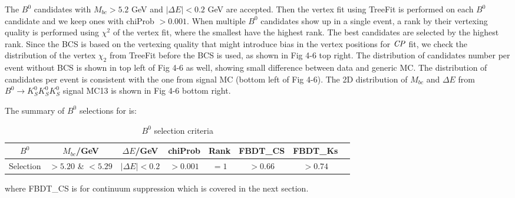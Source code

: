  The $B^0$ candidates with $M_{bc} > 5.2$ GeV and $|\Delta{E}| < 0.2$ GeV are accepted. Then the vertex fit using TreeFit is performed on each $B^0$ candidate and we keep ones with chiProb $> 0.001$. When multiple $B^0$ candidates show up in a single event, a rank by their vertexing quality is performed using $\chi^2$ of the vertex fit, where the smallest have the highest rank. The best candidates are selected  by the highest rank. Since the BCS is based on the vertexing quality that might introduce bias in the vertex positions for $\it{CP}$ fit, we check the distribution of the vertex $\chi_2$ from TreeFit before the BCS is used, as shown in Fig 4-6 top right. The distribution of candidates number per event without BCS is shown in top left of Fig 4-6 as well, showing small difference between data and generic MC. The distribution of candidates per event is consistent with the one from signal MC (bottom left of Fig 4-6). The 2D distribution of $M_{bc}$ and $\Delta E$ from $B^0 \to K_S^0  K_S^0  K_S^0$ signal MC13 is shown in Fig 4-6 bottom right.
 
 The summary of $B^0$ selections for is:
 \begin{table}[H]
 	\centering 
 	\begin{tabular}{|c|c|c|c|c|c|c|c|} 
 		\hline
 		$B^0$  & $M_{bc}$/GeV& $\Delta E$/GeV & chiProb & Rank & FBDT\_CS & FBDT\_Ks\\
 		\hline
 		Selection & $> 5.20$ \& $< 5.29$  &  $ |\Delta E|< 0.2$ & $> 0.001$  & $=1$ & $>0.66$ & $>0.74$\\
 		\hline
 	\end{tabular}
 	\caption{$B^0$ selection criteria}
 \end{table}
 where FBDT\_CS is for continuum suppression which is covered in the next section.
 
